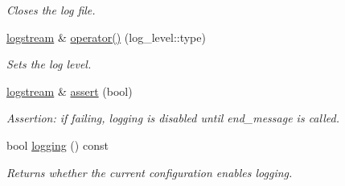 \begin{DoxyCompactItemize}
\begin{DoxyCompactList}\small\item\em Closes the log file. \end{DoxyCompactList}\item 
\hypertarget{a00326_a5a393fe8ddeb2980990a6274ecb2bd61}{\hyperlink{a00326}{logstream} \& \hyperlink{a00326_a5a393fe8ddeb2980990a6274ecb2bd61}{operator()} (log\-\_\-level\-::type)}\label{a00326_a5a393fe8ddeb2980990a6274ecb2bd61}

\begin{DoxyCompactList}\small\item\em Sets the log level. \end{DoxyCompactList}\item 
\hyperlink{a00326}{logstream} \& \hyperlink{a00326_a56de0ce1889be01adc18292271e53b42}{assert} (bool)
\begin{DoxyCompactList}\small\item\em Assertion\-: if failing, logging is disabled until end\-\_\-message is called. \end{DoxyCompactList}\item 
\hypertarget{a00326_a402aaf9489352bd0f003500db0c08567}{bool \hyperlink{a00326_a402aaf9489352bd0f003500db0c08567}{logging} () const }\label{a00326_a402aaf9489352bd0f003500db0c08567}

\begin{DoxyCompactList}\small\item\em Returns whether the current configuration enables logging. \end{DoxyCompactList}\end{DoxyCompactItemize}
